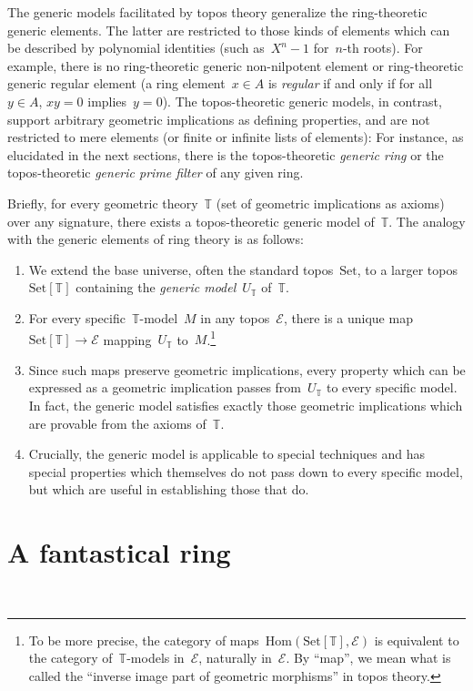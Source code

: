 \documentclass[10pt,reqno,a4paper,openany]{amsbook}
\theoremstyle{definition}
\theoremstyle{plain}
\theoremstyle{remark}
\newcommand{\EEE}{\mathcal{E}}
\newcommand{\TT}{\mathbb{T}}
\newcommand{\?}{\,{:}\,}
\renewcommand{\_}{\mathpunct{.}\,}
\renewcommand{\theenumi}{\alph{enumi}}
\newcommand{\Set}{\mathrm{Set}}
\begin{document}
The generic models facilitated by topos theory generalize the ring-theoretic
generic elements. The latter are restricted to those kinds of elements which
can be described by polynomial identities (such as~$X^n - 1$ for~$n$-th roots).
For example, there is no ring-theoretic generic non-nilpotent element
or ring-theoretic generic regular element (a ring element~$x \in A$ is
\emph{regular} if and only if for all~$y \in A$, $xy = 0$ implies~$y = 0$).
The topos-theoretic generic models, in contrast, support arbitrary geometric
implications as defining properties, and are not restricted to mere elements
(or finite or infinite lists of elements): For instance, as elucidated in the
next sections, there is the topos-theoretic \emph{generic ring} or the
topos-theoretic \emph{generic prime filter} of any given ring.

Briefly, for every geometric theory~$\TT$ (set of geometric implications as
axioms) over any signature, there exists a topos-theoretic generic model
of~$\TT$. The analogy with the generic elements of ring theory is as follows:
\begin{enumerate}
\renewcommand{\theenumi}{\arabic{enumi}}
\item We extend the base universe, often the standard topos~$\Set$, to a larger
topos~$\Set[\TT]$ containing the \emph{generic model}~$U_\TT$ of~$\TT$.
\item For every specific~$\TT$-model~$M$ in any topos~$\EEE$, there is a unique
map~$\Set[\TT] \to \EEE$ mapping~$U_\TT$ to~$M$.\footnote{To be more precise,
the category of maps~$\mathrm{Hom}(\Set[\TT],\EEE)$ is equivalent to the
category of~$\TT$-models in~$\EEE$, naturally in~$\EEE$. By ``map'', we mean
what is called the ``inverse image part of geometric morphisms'' in topos
theory.}
\item Since such maps preserve geometric implications, every property
which can be expressed as a geometric implication passes from~$U_\TT$ to every
specific model. In fact, the generic model satisfies exactly those geometric
implications which are provable from the axioms of~$\TT$.
\item Crucially, the generic model is applicable to special techniques and has
special properties which themselves do not pass down to every specific model,
but which are useful in establishing those that do.
\end{enumerate}


\section{A fantastical ring}
\newpage
\ \newpage
\end{document}
